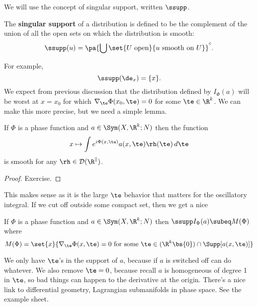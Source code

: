 We will use the concept of singular support, written $\ssupp$.
\begin{df}
The \textbf{singular support} of a distribution is defined to be the complement of the union of all the open sets on which the distribution is smooth:
\[
\ssupp(u)=\pa{\bigcup \set{U\text{ open}}{u\text{ smooth on }U}}^c.
\]
\end{df}
For example, 
\[\ssupp (\de_x)=\{x\}.\]
We expect from previous discussion that the distribution defined by $I_{\Phi}(a)$ will be worst at $x=x_0$ for which $\nabla_\te \Phi(x_0,\te)=0$ for some $\te\in \R^k$. We can make this more precise, but we need a simple lemma.
\begin{lem}
If $\Phi$ is a phase function and $a\in \Sym(X,\R^k;N)$ then the function 
\[
x\mapsto \int e^{i\Phi(x,\te)}a(x,\te)\rh(\te)\,d\te
\]
is smooth for any $\rh\in \cal D(\R^k)$.
\end{lem}
\begin{proof}
Exercise.
\end{proof}
This makes sense as it is the large $\te$ behavior that matters for the oscillatory integral. %
If we cut off outside some compact set, then we get a nice %
\begin{thm}
If $\Phi$ is a phase function and $a\in \Sym(X,\R^k;N)$ then $\ssupp I_{\Phi}(a)\subeq M(\Phi)$ where 
\[
M(\Phi)
=
\set{x}{\nabla_\te\Phi(x,\te)=0\text{ for some }\te\in (\R^k\bs \{0\})\cap \Supp[a(x,\te)]}
\]
\end{thm}
We only have $\te$'s in the support of $a$, because if $a$ is switched off can do whatever. We also remove $\te=0$, because recall $a$ is homogeneous of degree 1 in $\te$, so bad things can happen to the derivative at the origin.
There's a nice link to differential  geometry, Lagrangian submanifolds in phase space. See the example sheet.
